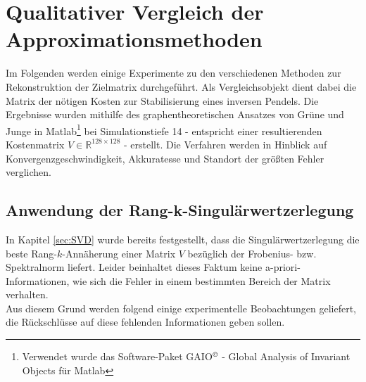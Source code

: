 \documentclass[12pt,a4paper,twoside]{article}
\begin{document}
\section{Qualitativer Vergleich der Approximationsmethoden}
Im Folgenden werden einige Experimente zu den verschiedenen Methoden zur Rekonstruktion der Zielmatrix durchgeführt. Als Vergleichsobjekt dient dabei die Matrix der nötigen Kosten zur Stabilisierung eines inversen Pendels. Die Ergebnisse wurden mithilfe des graphentheoretischen Ansatzes von Grüne und Junge \citep{Grune2005} in Matlab\footnote{Verwendet wurde das Software-Paket GAIO$^\copyright$	 - Global Analysis of Invariant Objects für Matlab} bei Simulationstiefe 14 - entspricht einer resultierenden Kostenmatrix $V\in\mathds{R}^{128\times 128}$ - erstellt. Die Verfahren werden in Hinblick auf Konvergenzgeschwindigkeit, Akkuratesse und Standort der größten Fehler verglichen.
\subsection{Anwendung der Rang-k-Singulärwertzerlegung}
In Kapitel \ref{sec:SVD} wurde bereits festgestellt, dass die Singulärwertzerlegung die beste Rang-$k$-Annäherung einer Matrix $V$ bezüglich der Frobenius- bzw. Spektralnorm liefert. Leider beinhaltet dieses Faktum keine a-priori-Informationen, wie sich die Fehler in einem bestimmten Bereich der Matrix verhalten. \\
Aus diesem Grund werden folgend einige experimentelle Beobachtungen geliefert, die Rückschlüsse auf diese fehlenden Informationen geben sollen. 
\end{document}
